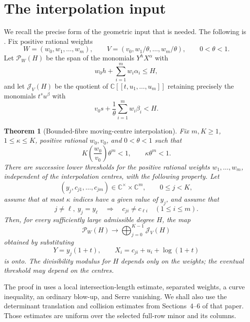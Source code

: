 \documentclass[11pt]{article}
\newcommand{\CC}{\mathbb C}
\newtheorem{theorem}{Theorem}[section]
\theoremstyle{definition}
\theoremstyle{remark}
\numberwithin{equation}{section}
\begin{document}
\section{The interpolation input}\label{sec:interpolation}

We recall the precise form of the geometric input that is needed.  The following is \cite[Theorem~9]{LiuJiangZhang2026}.  Fix
positive rational weights
\[
 W=(w_0,w_1,\ldots,w_m),\qquad
 V=(v_0,w_1/\theta,\ldots,w_m/\theta),
 \qquad 0<\theta<1.
\]
Let $\mathcal P_W(H)$ be the span of the monomials $Y^hX^\alpha$ with
\[
 w_0h+\sum_{i=1}^m w_i\alpha_i\le H,
\]
and let $\mathcal J_V(H)$ be the quotient of
$\CC[[t,u_1,\ldots,u_m]]$ retaining precisely the monomials
$t^su^\beta$ with
\[
 v_0s+\frac1\theta\sum_{i=1}^m w_i\beta_i<H.
\]

\begin{theorem}[Bounded-fibre moving-centre interpolation]\label{thm:MI}
Fix $m,K\ge1$, $1\le\kappa\le K$, positive rational $w_0,v_0$, and
$0<\theta<1$ such that
\begin{equation}\label{eq:MI-volume}
 K\left(\frac{w_0}{v_0}\right)\theta^m<1,
 \qquad \kappa\theta^m<1.
\end{equation}
There are successive lower thresholds for the positive rational weights
$w_1,\ldots,w_m$, independent of the interpolation centres, with the
following property.  Let
\[
 (y_j,c_{j1},\ldots,c_{jm})\in\CC^\times\times\CC^m,
 \qquad 0\le j<K,
\]
assume that at most $\kappa$ indices have a given value of $y_j$, and
assume that
\begin{equation}\label{eq:fibre-separation}
 j\ne\ell,\ y_j=y_\ell
 \quad\Longrightarrow\quad
 c_{ji}\ne c_{\ell i}\quad(1\le i\le m).
\end{equation}
Then, for every sufficiently large admissible degree $H$, the map
\[
 \mathcal P_W(H)\longrightarrow
 \bigoplus_{j=0}^{K-1}\mathcal J_V(H)
\]
obtained by substituting
\[
 Y=y_j(1+t),\qquad
 X_i=c_{ji}+u_i+\log(1+t)
\]
is onto.  The divisibility modulus for $H$ depends only on the weights;
the eventual threshold may depend on the centres.
\end{theorem}

The proof in \cite{LiuJiangZhang2026} uses a local intersection-length
estimate, separated weights, a curve inequality, an ordinary blow-up,
and Serre vanishing.  We shall also use the determinant translation and
collision estimates from Sections~4--6 of that paper.  Those estimates
are uniform over the selected full-row minor and its columns.
\end{document}
